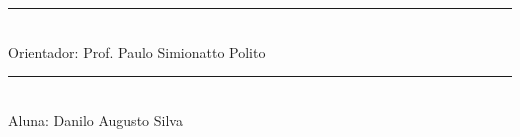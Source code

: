 \documentclass[12pt,times,portuguese,a4paper,pdftex]{article}
\begin{document}
\begin{minipage}{10cm}

\rule[0.3mm]{10cm}{0.3mm}\\
\small Orientador: Prof. Paulo Simionatto Polito

\bigskip\bigskip

\rule[0.3mm]{10cm}{0.3mm}\\
\small Aluna: Danilo Augusto Silva

\bigskip\bigskip

\end{minipage}
\end{document}
